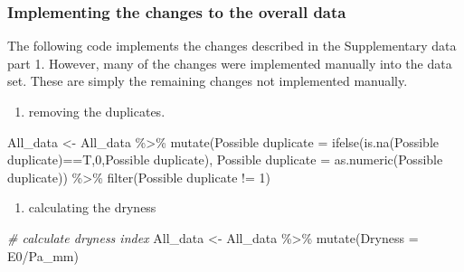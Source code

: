 \documentclass[]{elsarticle} %
\newenvironment{Shaded}{\begin{snugshade}}{\end{snugshade}}
\newcommand{\AttributeTok}[1]{\textcolor[rgb]{0.77,0.63,0.00}{#1}}
\newcommand{\CommentTok}[1]{\textcolor[rgb]{0.56,0.35,0.01}{\textit{#1}}}
\newcommand{\DecValTok}[1]{\textcolor[rgb]{0.00,0.00,0.81}{#1}}
\newcommand{\FunctionTok}[1]{\textcolor[rgb]{0.00,0.00,0.00}{#1}}
\newcommand{\NormalTok}[1]{#1}
\newcommand{\OtherTok}[1]{\textcolor[rgb]{0.56,0.35,0.01}{#1}}
\newcommand{\SpecialCharTok}[1]{\textcolor[rgb]{0.00,0.00,0.00}{#1}}
\newcommand{\StringTok}[1]{\textcolor[rgb]{0.31,0.60,0.02}{#1}}
\providecommand{\tightlist}{%
  \setlength{\itemsep}{0pt}\setlength{\parskip}{0pt}}
\begin{document}
\hypertarget{implementing-the-changes-to-the-overall-data}{%
\subsubsection{Implementing the changes to the overall data}\label{implementing-the-changes-to-the-overall-data}}

The following code implements the changes described in the Supplementary data part 1. However, many of the changes were implemented manually into the data set. These are simply the remaining changes not implemented manually.

\begin{enumerate}
\def\labelenumi{\arabic{enumi}.}
\tightlist
\item
  removing the duplicates.
\end{enumerate}

\begin{Shaded}
\begin{Highlighting}[]
\NormalTok{All\_data }\OtherTok{\textless{}{-}}\NormalTok{ All\_data }\SpecialCharTok{\%\textgreater{}\%}
  \FunctionTok{mutate}\NormalTok{(}\StringTok{\textasciigrave{}}\AttributeTok{Possible duplicate}\StringTok{\textasciigrave{}} \OtherTok{=} 
           \FunctionTok{ifelse}\NormalTok{(}\FunctionTok{is.na}\NormalTok{(}\StringTok{\textasciigrave{}}\AttributeTok{Possible duplicate}\StringTok{\textasciigrave{}}\NormalTok{)}\SpecialCharTok{==}\NormalTok{T,}\DecValTok{0}\NormalTok{,}\StringTok{\textasciigrave{}}\AttributeTok{Possible duplicate}\StringTok{\textasciigrave{}}\NormalTok{),}
         \StringTok{\textasciigrave{}}\AttributeTok{Possible duplicate}\StringTok{\textasciigrave{}} \OtherTok{=} \FunctionTok{as.numeric}\NormalTok{(}\StringTok{\textasciigrave{}}\AttributeTok{Possible duplicate}\StringTok{\textasciigrave{}}\NormalTok{)) }\SpecialCharTok{\%\textgreater{}\%}
  \FunctionTok{filter}\NormalTok{(}\StringTok{\textasciigrave{}}\AttributeTok{Possible duplicate}\StringTok{\textasciigrave{}} \SpecialCharTok{!=} \DecValTok{1}\NormalTok{)}
\end{Highlighting}
\end{Shaded}

\begin{enumerate}
\def\labelenumi{\arabic{enumi}.}
\setcounter{enumi}{1}
\tightlist
\item
  calculating the dryness
\end{enumerate}

\begin{Shaded}
\begin{Highlighting}[]
\CommentTok{\# calculate dryness index}
\NormalTok{All\_data }\OtherTok{\textless{}{-}}\NormalTok{ All\_data }\SpecialCharTok{\%\textgreater{}\%}
  \FunctionTok{mutate}\NormalTok{(}\AttributeTok{Dryness =}\NormalTok{ E0}\SpecialCharTok{/}\NormalTok{Pa\_mm)}
\end{Highlighting}
\end{Shaded}
\end{document}
